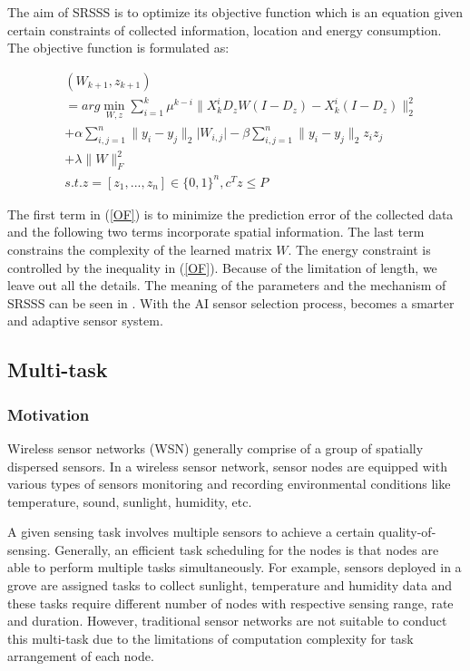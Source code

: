 The aim of SRSSS is to optimize its objective function which is an equation given
certain constraints of collected information, location and energy consumption.
The objective function is formulated as:

\begin{equation}
\label{OF}
\begin{aligned}
& (W_{k+1},z_{k+1})  \\
& = arg \min_{W,z} \sum_{i=1}^k \mu^{k-i}\lVert X_k^iD_zW(I-D_z)-X_k^i(I-D_z)\rVert^2_2 \\
& + \alpha\sum_{i,j=1}^n\lVert y_i-y_j\rVert_2\lvert W_{i,j} \rvert - \beta\sum_{i,j=1}^n\lVert y_i-y_j\rVert_2 z_iz_j \\
& + \lambda\lVert W \rVert^2_F \\
&s.t. z = [z_1,...,z_n] \in {\{0,1\}}^n, c^Tz \leq P
\end{aligned}
\end{equation}

The first term in (\ref{OF}) is to minimize the prediction error of the collected data
and the following two terms incorporate spatial information. The last term constrains
the complexity of the learned matrix $W$. The energy constraint is controlled by 
the inequality in (\ref{OF}). Because of the limitation of length,  we leave out all the details. 
The meaning of the parameters and the mechanism of 
SRSSS can be seen in \cite{li2016spatially}. With the AI sensor selection process, 
{\sdn} becomes a smarter and adaptive sensor system. 






\subsection{Multi-task}
\label{subsectionmultitask}
\subsubsection{Motivation}

Wireless sensor networks (WSN)  generally comprise of a group of 
spatially dispersed sensors. In a wireless sensor network, 
sensor nodes are equipped with various 
types of sensors monitoring and recording 
environmental conditions like temperature, sound, sunlight,
humidity, etc.

A given sensing task involves multiple sensors to 
achieve a certain quality-of-sensing.
Generally, an efficient task scheduling for the nodes is that nodes 
are able to perform multiple tasks simultaneously. 
For example, sensors deployed in a grove are assigned tasks to collect
sunlight, temperature and humidity data and these tasks require different 
number of  nodes with respective sensing range, rate and duration.
However, traditional sensor networks are not suitable to conduct this 
multi-task due to the limitations of computation complexity for task 
arrangement of each node.

